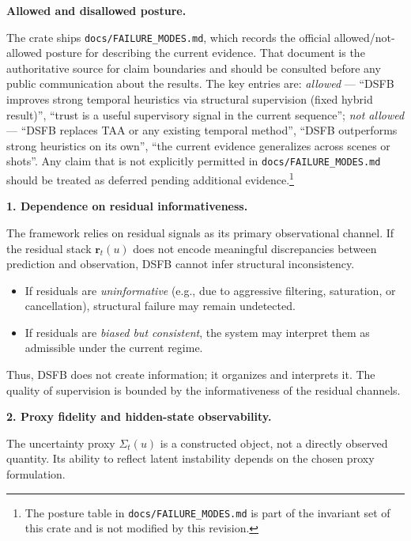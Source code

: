 \documentclass[11pt]{article}
\theoremstyle{definition}
\theoremstyle{plain}
\begin{document}
\vspace{0.5em}
\noindent
\textbf{Allowed and disallowed posture.}

The crate ships \texttt{docs/FAILURE\_MODES.md}, which records the official allowed/not-allowed posture for describing the current evidence. That document is the authoritative source for claim boundaries and should be consulted before any public communication about the results. The key entries are: \emph{allowed} --- ``DSFB improves strong temporal heuristics via structural supervision (fixed hybrid result)'', ``trust is a useful supervisory signal in the current sequence''; \emph{not allowed} --- ``DSFB replaces TAA or any existing temporal method'', ``DSFB outperforms strong heuristics on its own'', ``the current evidence generalizes across scenes or shots''. Any claim that is not explicitly permitted in \texttt{docs/FAILURE\_MODES.md} should be treated as deferred pending additional evidence.\footnote{The posture table in \texttt{docs/FAILURE\_MODES.md} is part of the invariant set of this crate and is not modified by this revision.}

\vspace{0.5em}
\noindent
\textbf{1. Dependence on residual informativeness.}

The framework relies on residual signals as its primary observational channel. If the residual stack $\mathbf{r}_t(u)$ does not encode meaningful discrepancies between prediction and observation, DSFB cannot infer structural inconsistency.

\begin{itemize}[leftmargin=1.5em]
    \item If residuals are \emph{uninformative} (e.g., due to aggressive filtering, saturation, or cancellation), structural failure may remain undetected.
    \item If residuals are \emph{biased but consistent}, the system may interpret them as admissible under the current regime.
\end{itemize}

Thus, DSFB does not create information; it organizes and interprets it. The quality of supervision is bounded by the informativeness of the residual channels.

\vspace{0.5em}
\noindent
\textbf{2. Proxy fidelity and hidden-state observability.}

The uncertainty proxy $\Sigma_t(u)$ is a constructed object, not a directly observed quantity. Its ability to reflect latent instability depends on the chosen proxy formulation.
\end{document}
